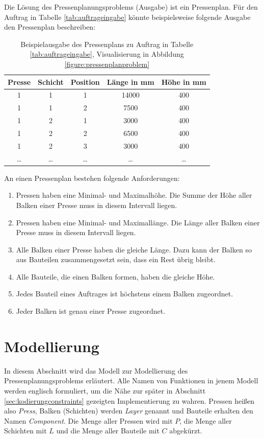 Die Lösung des Pressenplanungsproblems (Ausgabe) ist ein Pressenplan.
Für den Auftrag in Tabelle \ref{tab:auftrageingabe} könnte beispielsweise folgende Ausgabe den Pressenplan beschreiben:

\begin{table}[H]
    \centering
    \begin{tabular}{|c|c|c|c|c|}
        \hline
        \textbf{Presse} & \textbf{Schicht} & \textbf{Position} & \textbf{Länge in mm} & \textbf{Höhe in mm} \\
        \hline
        1 & 1 & 1 & 14000 & 400 \\
        1 & 1 & 2 & 7500 & 400 \\
        1 & 2 & 1 & 3000 & 400 \\
        1 & 2 & 2 & 6500 & 400 \\
        1 & 2 & 3 & 3000 & 400 \\
        \ldots & \ldots & \ldots & \ldots & \ldots \\
        \hline
    \end{tabular}
    \caption{Beispielausgabe des Pressenplans zu Auftrag in Tabelle \ref{tab:auftrageingabe}, Visualisierung in Abbildung \ref{figure:pressenplanproblem}}
    \label{tab:auftragausgabe}
\end{table}

An einen Pressenplan bestehen folgende Anforderungen:
\begin{enumerate}
    \item Pressen haben eine Minimal- und Maximalhöhe. Die Summe der Höhe aller Balken einer Presse muss in diesem Intervall liegen.
    \item Pressen haben eine Minimal- und Maximallänge. Die Länge aller Balken einer Presse muss in diesem Intervall liegen.
    \item Alle Balken einer Presse haben die gleiche Länge. Dazu kann der Balken so aus Bauteilen zusammengesetzt sein, dass ein Rest übrig bleibt.
    \item Alle Bauteile, die einen Balken formen, haben die gleiche Höhe.
    \item Jedes Bauteil eines Auftrages ist höchstens einem Balken zugeordnet.
    \item Jeder Balken ist genau einer Presse zugeordnet.
\end{enumerate}


\section{Modellierung}
\label{sec:modellierung}
In diesem Abschnitt wird das Modell zur Modellierung des Pressenplanungsproblems erläutert.
Alle Namen von Funktionen in jenem Modell werden englisch formuliert, um die Nähe zur später in Abschnitt \ref{sec:kodierungconstraints} gezeigten Implementierung zu wahren.
Pressen heißen also \textit{Press}, Balken (Schichten) werden \textit{Layer} genannt und Bauteile erhalten den Namen \textit{Component}.
Die Menge aller Pressen wird mit $P$, die Menge aller Schichten mit $L$ und die Menge aller Bauteile mit $C$ abgekürzt.

